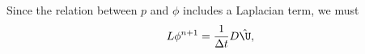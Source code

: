 \documentclass[11pt]{article}
\newcommand{\ReInv}{Re^{-1}}
\begin{document}
Since the relation between $p$ and $\phi$ includes a Laplacian term, we must
\begin{equation}\begin{aligned}
L \phi^{n+1} = \frac{1}{\Delta t} D\hat{\U}, \\
\end{aligned} \end{equation}

\newpage
\end{document}
